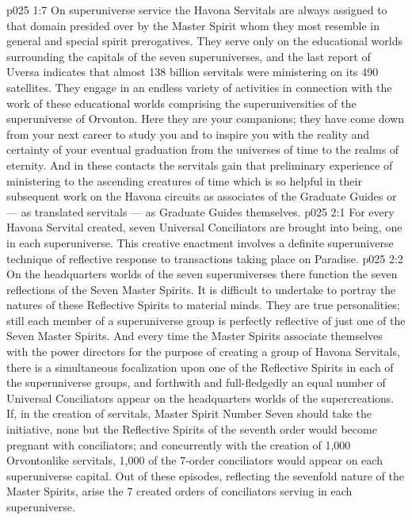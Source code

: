 \vs p025 1:7 On superuniverse service the Havona Servitals are always assigned to that domain presided over by the Master Spirit whom they most resemble in general and special spirit prerogatives. They serve only on the educational worlds surrounding the capitals of the seven superuniverses, and the last report of Uversa indicates that almost 138 billion servitals were ministering on its 490 satellites. They engage in an endless variety of activities in connection with the work of these educational worlds comprising the superuniversities of the superuniverse of Orvonton. Here they are your companions; they have come down from your next career to study you and to inspire you with the reality and certainty of your eventual graduation from the universes of time to the realms of eternity. And in these contacts the servitals gain that preliminary experience of ministering to the ascending creatures of time which is so helpful in their subsequent work on the Havona circuits as associates of the Graduate Guides or --- as translated servitals --- as Graduate Guides themselves.
\vs p025 2:1 For every Havona Servital created, seven Universal Conciliators are brought into being, one in each superuniverse. This creative enactment involves a definite superuniverse technique of reflective response to transactions taking place on Paradise.
\vs p025 2:2 On the headquarters worlds of the seven superuniverses there function the seven reflections of the Seven Master Spirits. It is difficult to undertake to portray the natures of these Reflective Spirits to material minds. They are true personalities; still each member of a superuniverse group is perfectly reflective of just one of the Seven Master Spirits. And every time the Master Spirits associate themselves with the power directors for the purpose of creating a group of Havona Servitals, there is a simultaneous focalization upon one of the Reflective Spirits in each of the superuniverse groups, and forthwith and full\hyp{}fledgedly an equal number of Universal Conciliators appear on the headquarters worlds of the supercreations. If, in the creation of servitals, Master Spirit Number Seven should take the initiative, none but the Reflective Spirits of the seventh order would become pregnant with conciliators; and concurrently with the creation of 1,000 Orvontonlike servitals, 1,000 of the 7\hyp{}order conciliators would appear on each superuniverse capital. Out of these episodes, reflecting the sevenfold nature of the Master Spirits, arise the 7 created orders of conciliators serving in each superuniverse.
